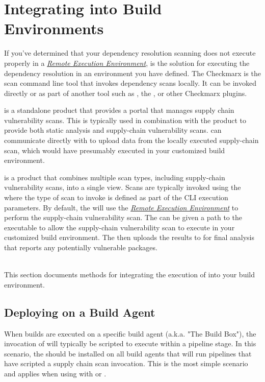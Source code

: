 \chapter{Integrating \scaresolver into Build Environments}\label{chap:ext_build_env}

If you've determined that your dependency resolution scanning does not execute properly
in a \hyperref[sssec:remote_environment]{\textit{Remote Execution Environment}}, \scaresolver
is the solution for executing the dependency resolution in an environment you have defined.
The Checkmarx \scaresolver is the scan command line tool that invokes 
dependency scans locally.  It can be invoked directly or as part of another
tool such as \cxflow, the \cxonecli, or other Checkmarx plugins.

\cxsca is a standalone product that provides a portal that manages supply chain vulnerability scans.  This is
typically used in combination with the \cxsast product to provide both static analysis and supply-chain vulnerability
scans.  \scaresolver can communicate directly with \cxsca to upload data from the locally executed supply-chain
scan, which would have presumably executed in your customized build environment.

\cxone is a product that combines multiple scan types, including supply-chain vulnerability scans, into a single
view.  Scans are typically invoked using the \cxonecli where the type of scan to invoke is defined as part
of the CLI execution parameters.  By default, the \cxonecli will use the 
\hyperref[sssec:remote_environment]{\textit{Remote Execution Environment}} to perform the supply-chain
vulnerability scan.  The \cxonecli can be given a path to the \scaresolver executable to allow
the supply-chain vulnerability scan to execute in your customized build environment.  The \cxonecli then uploads
the results to \cxone for final analysis that reports any potentially vulnerable packages.


\noindent\\This section documents methods for integrating the execution of \scaresolver into your
build environment.


\section{Deploying on a Build Agent}

When builds are executed on a specific build agent (a.k.a. "The Build Box"),
the invocation of \scaresolver will typically be scripted to execute
within a pipeline stage.  In this scenario, the \scaresolver should be
installed on all build agents that will run pipelines that have scripted
a supply chain scan invocation.  This is the most simple scenario and applies
when using \scaresolver with \cxsca or \cxone.

